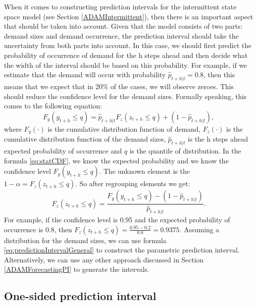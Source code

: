 \documentclass[]{book}
\theoremstyle{definition}
\theoremstyle{definition}
\theoremstyle{definition}
\theoremstyle{definition}
\theoremstyle{remark}
\begin{document}
When it comes to constructing prediction intervals for the intermittent state space model (see Section \ref{ADAMIntermittent}), then there is an important aspect that should be taken into account. Given that the model consists of two parts: demand sizes and demand occurrence, the prediction interval should take the uncertainty from both parts into account. In this case, we should first predict the probability of occurrence of demand for the h steps ahead and then decide what the width of the interval should be based on this probability. For example, if we estimate that the demand will occur with probability \(\hat{p}_{t+h|t} = 0.8\), then this means that we expect that in 20\% of the cases, we will observe zeroes. This should reduce the confidence level for the demand sizes. Formally speaking, this comes to the following equation:
\begin{equation}
    F_y(y_{t+h} \leq q) = \hat{p}_{t+h|t} F_z(z_{t+h} \leq q) +(1 -\hat{p}_{t+h|t}),
    \label{eq:statCDF}
\end{equation}
where \(F_y(\cdot)\) is the cumulative distribution function of demand, \(F_z(\cdot)\) is the cumulative distribution function of the demand sizes, \(\hat{p}_{t+h|t}\) is the h steps ahead expected probability of occurrence and \(q\) is the quantile of distribution. In the formula \eqref{eq:statCDF}, we know the expected probability and we know the confidence level \(F_y(y_{t+h} \leq q)\). The unknown element is the \(1-\alpha = F_z(z_{t+h} \leq q)\). So after regrouping elements we get:
\begin{equation}
    F_z(z_{t+h} \leq q) = \frac{F_y(y_{t+h} \leq q) -(1 -\hat{p}_{t+h|t})}{\hat{p}_{t+h|t}}.
    \label{eq:statCDFDemandSizes}
\end{equation}
For example, if the confidence level is 0.95 and the expected probability of occurrence is 0.8, then \(F_z(z_{t+h} \leq q) = \frac{0.95 -0.2}{0.8} = 0.9375\). Assuming a distribution for the demand sizes, we can use formula \eqref{eq:predictionIntervalGeneral} to construct the parametric prediction interval. Alternatively, we can use any other approach discussed in Section \ref{ADAMForecastingPI} to generate the intervals.

\hypertarget{forecastingADAMOtherOneSided}{%
\subsection{One-sided prediction interval}\label{forecastingADAMOtherOneSided}}
\end{document}
